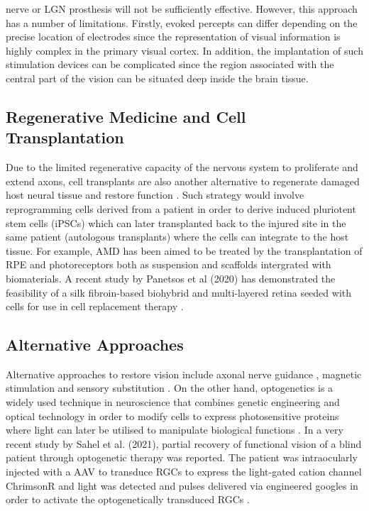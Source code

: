 nerve or LGN prosthesis will not be sufficiently effective. However, this approach has a number of limitations. Firstly, evoked percepts can differ depending on the precise location of electrodes since the representation of visual information is highly complex in the primary visual cortex. In addition, the implantation of such stimulation devices can be complicated since the region associated with the central part of the vision can be situated deep inside the brain tissue. \cite{pezaris2007demonstration}


\subsection{Regenerative Medicine and Cell Transplantation}

Due to the limited regenerative capacity of the nervous system to proliferate and extend axons, cell transplants are also another alternative to regenerate damaged host neural tissue and restore function \cite{rochford2020bio}. Such strategy would involve reprogramming cells derived from a patient in order to derive induced pluriotent stem cells (iPSCs) \cite{takahashi2006induction} which can later transplanted back to the injured site in the same patient  (autologous transplants) \cite{rochford2020bio} where the cells can integrate to the host tissue. For example, AMD has been aimed to be treated by the transplantation of RPE and photoreceptors both as suspension and scaffolds intergrated with biomaterials. A recent study by Panetsos et al (2020) has demonstrated the feasibility of a silk fibroin-based biohybrid and multi-layered retina seeded with cells for use in cell replacement therapy \cite{jemni2020first}.

\subsection{Alternative Approaches}
Alternative approaches to restore vision include axonal nerve guidance \cite{mehenti2006model}, magnetic stimulation \cite{sabel2020vision} and sensory substitution \cite{lee2014successful}. On the other hand, optogenetics is a widely used technique in neuroscience that combines genetic engineering and optical technology in order to modify cells to express photosensitive proteins where light can later be utilised to manipulate biological functions \cite{joshi2020optogenetics}. In a very recent study by Sahel et al. (2021), partial recovery of functional vision of a blind patient through optogenetic therapy was reported. The patient was intraocularly injected with a AAV to transduce RGCs to express the light-gated cation channel ChrimsonR and light was detected and pulses delivered via engineered googles in order to activate the optogenetically transduced RGCs \cite{sahel2021partial}.

